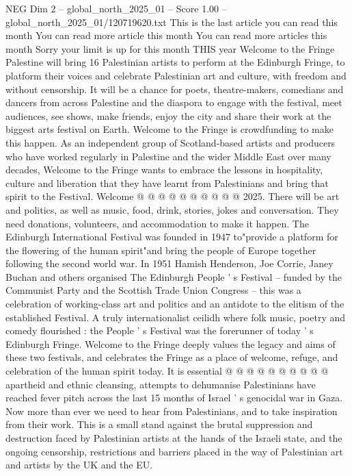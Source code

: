 \begin{textsample}{NEG Dim 2 – global\_north\_2025\_01 – Score 1.00 – global\_north\_2025\_01/120719620.txt}  \label{ex:f2_neg_048}
This is the last article you can read this month You can read more article this month You can read more articles this month Sorry your limit is up for this month THIS year Welcome to the Fringe Palestine will bring 16 Palestinian artists to perform at the Edinburgh Fringe, to platform their voices and celebrate Palestinian art and culture, with freedom and without censorship.
It will be a chance for poets, theatre-makers, comedians and dancers from across Palestine and the diaspora to engage with the festival, meet audiences, see shows, make friends, enjoy the city and share their work at the biggest arts festival on Earth.
Welcome to the Fringe is crowdfunding to make this happen.
As an independent group of Scotland-based artists and producers who have worked regularly in Palestine and the wider Middle East over many decades, Welcome to the Fringe wants to embrace the lessons in hospitality, culture and liberation that they have learnt from Palestinians and bring that spirit to the Festival.
Welcome @ @ @ @ @ @ @ @ @ @ 2025.
There will be art and politics, as well as music, food, drink, stories, jokes and conversation.
They need donations, volunteers, and accommodation to make it happen.
The Edinburgh International Festival was founded in 1947 to"provide a platform for the flowering of the human spirit"and bring the people of Europe together following the second world war.
In 1951 Hamish Henderson, Joe Corrie, Janey Buchan and others organised The Edinburgh People ' s Festival -- funded by the Communist Party and the Scottish Trade Union Congress -- this was a celebration of working-class art and politics and an antidote to the elitism of the established Festival.
A truly internationalist ceilidh where folk music, poetry and comedy flourished : the People ' s Festival was the forerunner of today ' s Edinburgh Fringe.
Welcome to the Fringe deeply values the legacy and aims of these two festivals, and celebrates the Fringe as a place of welcome, refuge, and celebration of the human spirit today.
It is essential @ @ @ @ @ @ @ @ @ @ apartheid and ethnic cleansing, attempts to dehumanise Palestinians have reached fever pitch across the last 15 months of Israel ' s genocidal war in Gaza.
Now more than ever we need to hear from Palestinians, and to take inspiration from their work.
This is a small stand against the brutal suppression and destruction faced by Palestinian artists at the hands of the Israeli state, and the ongoing censorship, restrictions and barriers placed in the way of Palestinian art and artists by the UK and the EU.

\end{textsample}
